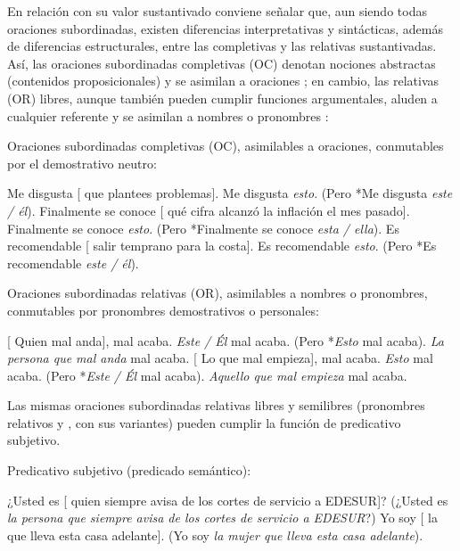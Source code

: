 En relación con su valor sustantivado conviene señalar que, aun siendo todas
oraciones subordinadas, existen diferencias interpretativas y sintácticas,
además de diferencias estructurales, entre las completivas y las relativas
sustantivadas. Así, las oraciones subordinadas completivas (OC) denotan nociones
abstractas (contenidos proposicionales) y se asimilan a oraciones
; en cambio, las relativas (OR) libres, aunque también pueden
cumplir funciones argumentales, aluden a cualquier referente y se asimilan a
nombres o pronombres :

\begin{exe}
  \ex\label{ex:13-esto} Oraciones subordinadas completivas (OC), asimilables a
      oraciones, conmutables por el demostrativo neutro:
    \begin{xlist}
      \ex Me disgusta [ que plantees problemas]. Me disgusta
          \textit{esto}. (Pero *Me disgusta \textit{este / él}).
      \ex Finalmente se conoce [ qué cifra alcanzó la inflación el mes
          pasado]. Finalmente se conoce \textit{esto}. (Pero *Finalmente se conoce
          \textit{esta / ella}).
      \ex Es recomendable [ salir temprano para la costa]. Es
          recomendable \textit{esto}. (Pero *Es recomendable \textit{este / él}).
    \end{xlist}
  \ex\label{ex:13-este} Oraciones subordinadas relativas (OR), asimilables a
      nombres o pronombres, conmutables por pronombres demostrativos o
      personales:
    \begin{xlist}
      \ex {}[ Quien mal anda], mal acaba. \textit{Este / Él} mal acaba.
          (Pero *\textit{Esto} mal acaba). \textit{La persona que mal anda} mal
          acaba.
      \ex {}[ Lo que mal empieza], mal acaba. \textit{Esto} mal acaba.
          (Pero *\textit{Este / Él} mal acaba). \textit{Aquello que mal empieza}
          mal acaba.
    \end{xlist}
\end{exe}

Las mismas oraciones subordinadas relativas libres y semilibres (pronombres
relativos  y , con sus variantes) pueden cumplir la
función de predicativo subjetivo.

\begin{exe}
  \ex\label{ex:13-predrel} Predicativo subjetivo (predicado semántico):
    \begin{xlist}
      \ex\label{ex:13-predrel-a} ¿Usted es [ quien siempre avisa de
          los cortes de servicio a EDESUR]? (¿Usted es \textit{la persona que
          siempre avisa de los cortes de servicio a EDESUR}?)
      \ex\label{ex:13-predrel-b} Yo soy [ la que lleva esta casa
          adelante]. (Yo soy \textit{la mujer que lleva esta casa adelante}).
    \end{xlist}
\end{exe}

